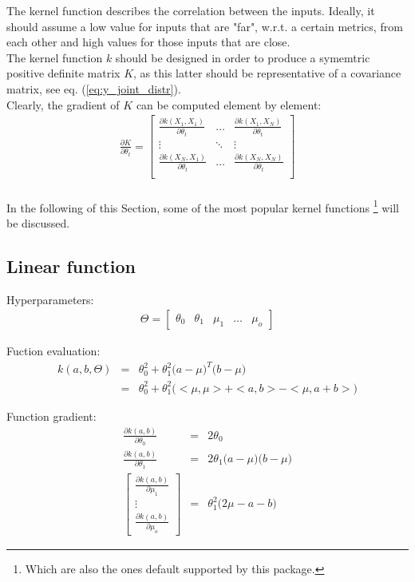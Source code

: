 \documentclass{article}
\begin{document}
The kernel function describes the correlation between the inputs. Ideally, it should assume a low value for inputs that are "far", w.r.t. a certain metrics, from each other and high values for those inputs that are close.
\\
The kernel function $k$ should be designed in order to produce a symemtric positive definite matrix $K$, as this latter should be representative of a covariance matrix, see eq. (\ref{eq:y_joint_distr}).
\\
Clearly, the gradient of $K$ can be computed element by element:
\begin{eqnarray}
\frac{\partial K}{\partial \theta_t} = 
\begin{bmatrix}
\frac{\partial k(X_1, X_1)}{\partial \theta_t} & \hdots & \frac{\partial k(X_1, X_N)}{\partial \theta_t} \\ 
\vdots & \ddots & \vdots \\ 
\frac{\partial k(X_N, X_1)}{\partial \theta_t} & \hdots & \frac{\partial k(X_N, X_N)}{\partial \theta_t} \\ 
\end{bmatrix}
\end{eqnarray}
\\
In the following of this Section, some of the most popular kernel functions \footnote{Which are also the ones default supported by this package.}  will be discussed.

\subsection{Linear function}

Hyperparameters:
\begin{eqnarray}
\Theta = \begin{bmatrix} \theta_0 & \theta_1 & \mu_1 & \hdots & \mu_o \end{bmatrix}
\end{eqnarray}

Fuction evaluation:
\begin{eqnarray}
k(a,b,\Theta) 
&=&
\theta_0^2 + \theta_1^2 \big ( a-\mu \big )^T \big ( b-\mu \big ) \\
&=&
\theta_0^2 + \theta_1^2 \big ( <\mu, \mu> + <a, b> - <\mu, a + b> \big )
\end{eqnarray}

Function gradient:
\begin{eqnarray}
\frac{\partial k (a,b)}{\partial \theta_0} &=& 2 \theta_0 \\
\frac{\partial k (a,b)}{\partial \theta_1} &=& 2 \theta_1 \big ( a - \mu \big ) \big ( b - \mu \big ) \\
\begin{bmatrix} 
\frac{\partial k (a,b)}{\partial \mu_1} 
\\ 
\vdots
\\ 
\frac{\partial k (a,b)}{\partial \mu_o} 
\end{bmatrix}
&=& \theta_1^2 \big ( 2\mu - a - b \big )
\end{eqnarray}
\end{document}
